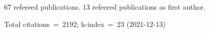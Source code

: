 67 refereed publications. 13 refeered publications as first author.

Total citations~=~2192; h-index~=~23 (2021-12-13)